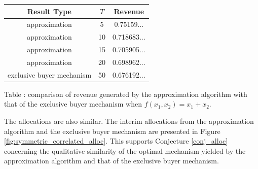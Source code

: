 \documentclass{article}
\newcounter{fig}
\begin{document}
\begin{center}
    \begin{tabular}{ |c|c|c| } 
    \hline
    Result Type & $T$ & Revenue \\
    \hline
    \hline
    approximation & 5 & 0.75159... \\ 
    approximation & 10 & 0.718683... \\ 
    approximation & 15 & 0.705905... \\ 
    approximation & 20 & 0.698962... \\ 
    exclusive buyer mechanism & 50 & 0.676192... \\
    \hline
    \end{tabular}

    \vspace{1mm}
    \raggedright{\small {\sc Table \thefig\label{table:symm_correlated_revenue}:} comparison of revenue generated by the approximation algorithm with that of the exclusive buyer mechanism when $f(x_1,x_2) = x_1 + x_2$.}
\end{center}

The allocations are also similar. The interim allocations from the approximation algorithm and the exclusive buyer mechanism are presented in Figure \ref{fig:symmetric_correlated_alloc}. This supports Conjecture \ref{conj_alloc} concerning the qualitative similarity of the optimal mechanism yielded by the approximation algorithm and that of the exclusive buyer mechanism.
\end{document}
